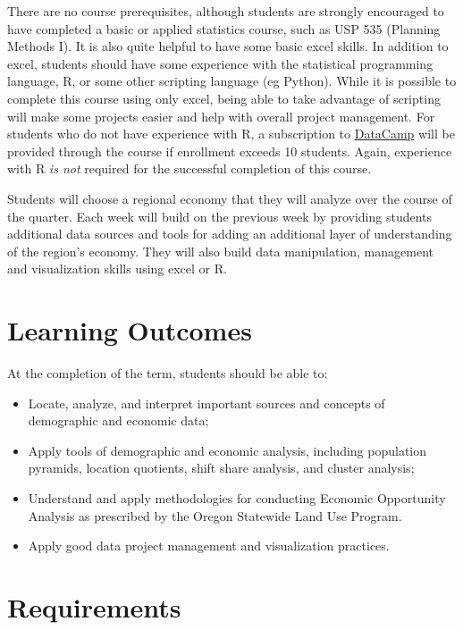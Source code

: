 \documentclass[11pt,]{article}
\begin{document}
There are no course prerequisites, although students are strongly
encouraged to have completed a basic or applied statistics course, such
as USP 535 (Planning Methods I). It is also quite helpful to have some
basic excel skills. In addition to excel, students should have some
experience with the statistical programming language, R, or some other
scripting language (eg Python). While it is possible to complete this
course using only excel, being able to take advantage of scripting will
make some projects easier and help with overall project management. For
students who do not have experience with R, a subscription to
\href{https://www.datacamp.com/}{DataCamp} will be provided through the
course if enrollment exceeds 10 students. Again, experience with R
\emph{is not} required for the successful completion of this course.

Students will choose a regional economy that they will analyze over the
course of the quarter. Each week will build on the previous week by
providing students additional data sources and tools for adding an
additional layer of understanding of the region's economy. They will
also build data manipulation, management and visualization skills using
excel or R.

\section{Learning Outcomes}\label{learning-outcomes}

At the completion of the term, students should be able to:

\begin{itemize}
\item
  Locate, analyze, and interpret important sources and concepts of
  demographic and economic data;
\item
  Apply tools of demographic and economic analysis, including population
  pyramids, location quotients, shift share analysis, and cluster
  analysis;
\item
  Understand and apply methodologies for conducting Economic Opportunity
  Analysis as prescribed by the Oregon Statewide Land Use Program.
\item
  Apply good data project management and visualization practices.
\end{itemize}

\section{Requirements}\label{requirements}
\end{document}
